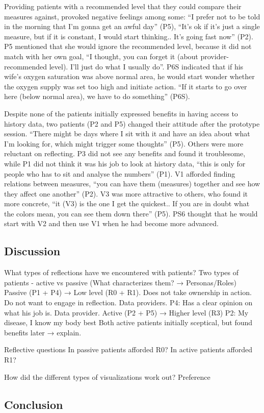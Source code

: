 Providing patients with a recommended level that they could compare their measures against, provoked negative feelings among some: “I prefer not to be told in the morning that I’m gonna get an awful day” (P5), “It’s ok if it’s just a single measure, but if it is constant, I would start thinking.. It’s going fast now” (P2). P5 mentioned that she would ignore the recommended level, because it did not match with her own goal, “I thought, you can forget it (about provider-recommended level). I’ll just do what I usually do”. P6S indicated that if his wife’s oxygen saturation was above normal area, he would start wonder whether the oxygen supply was set too high and initiate action. “If it starts to go over here (below normal area), we have to do something” (P6S). 

Despite none of the patients initially expressed benefits in having access to history data, two patients (P2 and P5) changed their attitude after the prototype session. “There might be days where I sit with it and have an idea about what I’m looking for, which might trigger some thoughts” (P5). Others were more reluctant on reflecting. P3 did not see any benefits and found it troublesome, while P1 did not think it was his job to look at history data, “this is only for people who has to sit and analyse the numbers” (P1). V1 afforded finding relations between measures, “you can have them (measures) together and see how they affect one another” (P2). V3 was more attractive to others, who found it more concrete, “it (V3) is the one I get the quickest.. If you are in doubt what the colors mean, you can see them down there” (P5). PS6 thought that he would start with V2 and then use V1 when he had become more advanced. 

\subsection{Discussion}

What types of reflections have we encountered with patients?
Two types of patients - active vs passive (What characterizes them? → Personas/Roles)
Passive (P1 + P4) → Low level (R0 + R1). Does not take ownership in action. Do not want to engage in reflection. Data providers.
P4: Has a clear opinion on what his job is. Data provider.
Active (P2 + P5) → Higher level (R3)
P2: My disease, I know my body best
Both active patients initially sceptical, but found benefits later → explain.

Reflective questions
In passive patients afforded R0?
In active patients afforded R1?

How did the different types of visualizations work out?
Preference 


\subsection{Conclusion}